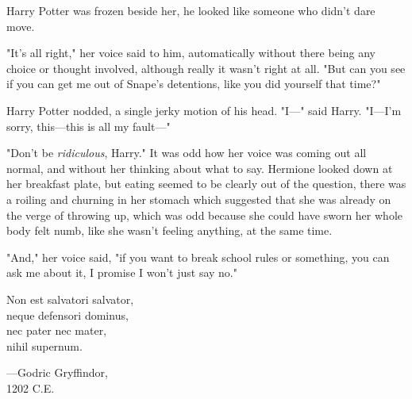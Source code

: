 Harry Potter was frozen beside her, he looked like someone who didn't dare move.

"It's all right," her voice said to him, automatically without there being any
choice or thought involved, although really it wasn't right at all. "But can
you see if you can get me out of Snape's detentions, like you did yourself that
time?"

Harry Potter nodded, a single jerky motion of his head. "I---" said Harry.
"I---I'm sorry, this---this is all my fault---"

"Don't be \emph{ridiculous}, Harry." It was odd how her voice was coming out
all normal, and without her thinking about what to say. Hermione looked down at
her breakfast plate, but eating seemed to be clearly out of the question, there
was a roiling and churning in her stomach which suggested that she was already
on the verge of throwing up, which was odd because she could have sworn her
whole body felt numb, like she wasn't feeling anything, at the same time.

"And," her voice said, "if you want to break school rules or something, you can
ask me about it, I promise I won't just say no."
\sbreak
\begin{center}
Non est salvatori salvator,\\
neque defensori dominus,\\
nec pater nec mater,\\
nihil supernum.

---Godric Gryffindor,\\
1202 C.E.
\end{center}
